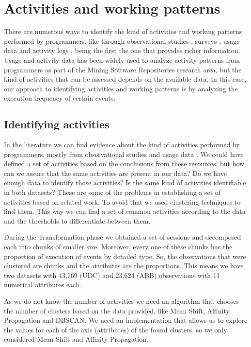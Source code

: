 \section{Activities and working patterns}
There are numerous ways to identify the kind of activities and working patterns performed by programmers, like through observational studies \cite{GM04}, surveys \cite{PR11}, usage data \cite{MPB12} and activity logs \cite{CLQ15}, being the first the one that provides richer information. Usage and activity data has been widely used to analyze activity patterns from programmers as part of the Mining Software Repositories research area, but the kind of activities that can be assessed depends on the available data. In this case, our approach to identifying activities and working patterns is by analyzing the execution frequency of certain events.

\subsection{Identifying activities}
In the literature we can find evidence about the kind of activities performed by programmers, mostly from observational studies and usage data \cite{LVD06, GM04, MMLK14, MKF06}. We could have defined a set of activities based on the conclusions from these resources, but how can we assure that the same activities are present in our data? Do we have enough data to identify those activities? Is the same kind of activities identifiable in both datasets? These are some of the problems in establishing a set of activities based on related work. To avoid that we used clustering techniques to find them. This way we can find a set of common activities according to the data and the thresholds to differentiate between them.

During the Transformation phase we obtained a set of sessions and decomposed each into chunks of smaller size. Moreover, every one of these chunks has the proportion of execution of events by detailed type. So, the observations that were clustered are chunks and the attributes are the proportions. This means we have two datasets with 43,769 (UDC) and 23,624 (ABB) observations with 11 numerical attributes each.

As we do not know the number of activities we need an algorithm that chooses the number of clusters based on the data provided, like Mean Shift, Affinity Propagation and DBSCAN. We need an implementation that allows us to explore the values for each of the axis (attributes) of the found clusters, so we only considered Mean Shift and Affinity Propagation.

